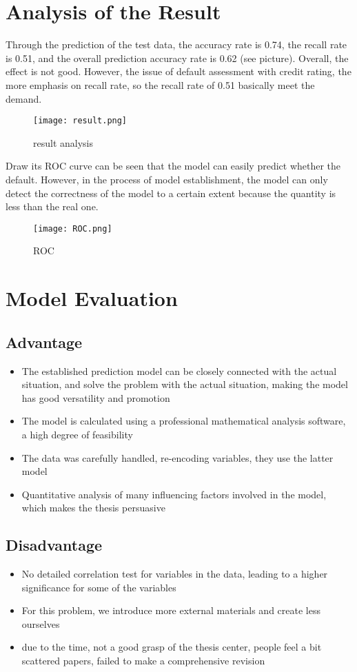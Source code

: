 \documentclass{mcmthesis}
\begin{document}
\section{Analysis of the Result}
Through the prediction of the test data, the accuracy rate is 0.74, the recall rate is 0.51, and the overall prediction accuracy rate is 0.62 (see picture). Overall, the effect is not good. However, the issue of default assessment with credit rating, the more emphasis on recall rate, so the recall rate of 0.51 basically meet the demand.
\begin{figure}[h]
\small
\centering
\texttt{[image: result.png]}
\caption{result analysis} \label{fig:result analysis}
\end{figure}
\newline

Draw its ROC curve can be seen that the model can easily predict whether the default. However, in the process of model establishment, the model can only detect the correctness of the model to a certain extent because the quantity is less than the real one.
\begin{figure}[h]
\small
\centering
\texttt{[image: ROC.png]}
\caption{ROC} \label{fig:ROC}
\end{figure}

\section{Model Evaluation}
\subsection{Advantage}
\begin{itemize}
\item The established prediction model can be closely connected with the actual situation, and solve the problem with the actual situation, making the model has good versatility and promotion
\item The model is calculated using a professional mathematical analysis software, a high degree of feasibility
\item The data was carefully handled, re-encoding variables, they use the latter model
\item Quantitative analysis of many influencing factors involved in the model, which makes the thesis persuasive
\end{itemize}
\subsection{Disadvantage}
\begin{itemize}
\item No detailed correlation test for variables in the data, leading to a higher significance for some of the variables
\item For this problem, we introduce more external materials and create less ourselves
\item due to the time, not a good grasp of the thesis center, people feel a bit scattered papers, failed to make a comprehensive revision
\end{itemize}
\end{document}
